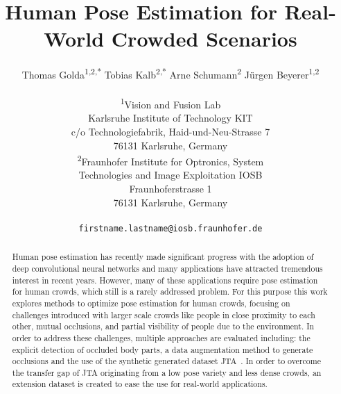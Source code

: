 \documentclass[10pt,twocolumn,letterpaper]{article}
\begin{document}
\title{Human Pose Estimation for Real-World Crowded Scenarios}
\author{
Thomas Golda\textsuperscript{1,2,*}\quad
Tobias Kalb\textsuperscript{2,*}\quad
Arne Schumann\textsuperscript{2}\quad
J\"urgen Beyerer\textsuperscript{1,2}\\
\begin{minipage}[t]{0.5\linewidth}
\vspace{.05cm}
\begin{center}
\textsuperscript{1}Vision and Fusion Lab\\
Karlsruhe Institute of Technology KIT\\
c/o Technologiefabrik, Haid-und-Neu-Strasse 7\\
76131 Karlsruhe, Germany
\end{center}
\end{minipage}
\begin{minipage}[t]{0.5\linewidth}
\vspace{.05cm}
\begin{center}
\textsuperscript{2}Fraunhofer Institute for Optronics, System\\Technologies and Image Exploitation IOSB\\
Fraunhoferstrasse 1\\
76131 Karlsruhe, Germany
\end{center}
\vspace{.05cm}
\end{minipage}\\
{\tt\small firstname.lastname@iosb.fraunhofer.de}\\
}

\maketitle
\begin{abstract}
Human pose estimation has recently made significant progress with the adoption of deep convolutional neural networks and many applications have attracted tremendous interest in recent years.
However, many of these applications require pose estimation for human crowds, which still is a rarely addressed problem.
For this purpose this work explores methods to optimize pose estimation for human crowds, focusing on challenges introduced with larger scale crowds like people in close proximity to each other, mutual occlusions, and partial visibility of people due to the environment.
In order to address these challenges, multiple approaches are evaluated including: the explicit detection of occluded body parts, a data augmentation method to generate occlusions and the use of the synthetic generated dataset JTA~\cite{fabbri2018learning}.
In order to overcome the transfer gap of JTA originating from a low pose variety and less dense crowds, an extension dataset is created to ease the use for real-world applications.
\end{abstract}
\end{document}
